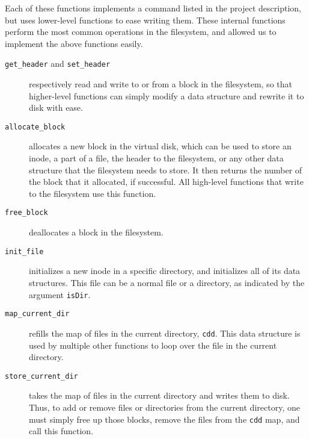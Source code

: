 \documentclass[twoside]{article}
\begin{document}
\begin{multicols}{2}
Each of these functions implements a command listed in the project description,
but uses lower-level functions to ease writing them. These internal functions
perform the most common operations in the filesystem, and allowed us to
implement the above functions easily.

\begin{description}
  \item[\texttt{get\_header} and \texttt{set\_header}] respectively read and
    write to or from a block in the filesystem, so that higher-level functions
    can simply modify a data structure and rewrite it to disk with ease.
  \item[\texttt{allocate\_block}] allocates a new block in the virtual disk,
    which can be used to store an inode, a part of a file, the header to the
    filesystem, or any other data structure that the filesystem needs to store.
    It then returns the number of the block that it allocated, if successful.
    All high-level functions that write to the filesystem use this function.
  \item[\texttt{free\_block}] deallocates a block in the filesystem.
  \item[\texttt{init\_file}] initializes a new inode in a specific directory,
    and initializes all of its data structures. This file can be a normal file
    or a directory, as indicated by the argument \texttt{isDir}.
  \item[\texttt{map\_current\_dir}] refills the map of files in the current
    directory, \texttt{cdd}. This data structure is used by multiple other
    functions to loop over the file in the current directory.
  \item[\texttt{store\_current\_dir}] takes the map of files in the current
    directory and writes them to disk. Thus, to add or remove files or
    directories from the current directory, one must simply free up those
    blocks, remove the files from the \texttt{cdd} map, and call this function.
\end{description}


\end{multicols}
\end{document}
